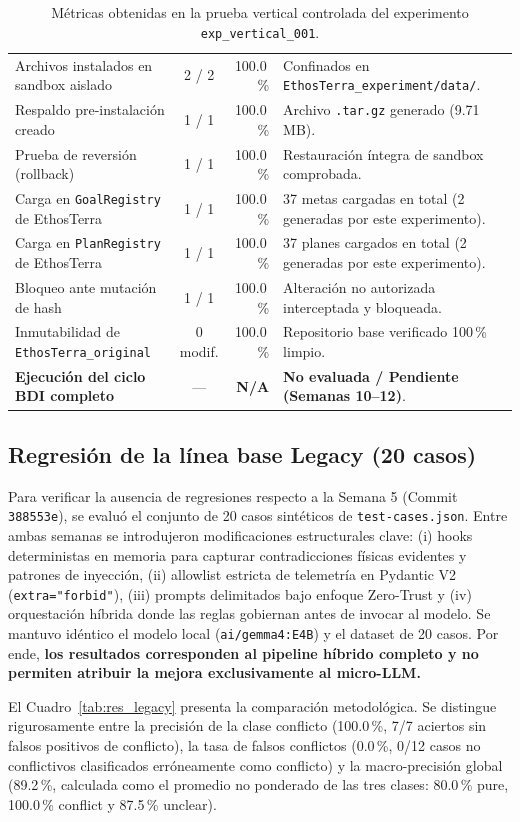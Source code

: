 \documentclass[11pt,a4paper]{article}
\begin{document}
\begin{table}[H]
\begin{tabularx}{\textwidth}{lcrX}
Archivos instalados en sandbox aislado & 2 / 2 & 100.0\,\% & Confinados en \texttt{EthosTerra\_experiment/data/}. \\
Respaldo pre-instalación creado & 1 / 1 & 100.0\,\% & Archivo \texttt{.tar.gz} generado (9.71 MB). \\
Prueba de reversión (rollback) & 1 / 1 & 100.0\,\% & Restauración íntegra de sandbox comprobada. \\
Carga en \texttt{GoalRegistry} de EthosTerra & 1 / 1 & 100.0\,\% & 37 metas cargadas en total (2 generadas por este experimento). \\
Carga en \texttt{PlanRegistry} de EthosTerra & 1 / 1 & 100.0\,\% & 37 planes cargados en total (2 generadas por este experimento). \\
Bloqueo ante mutación de hash & 1 / 1 & 100.0\,\% & Alteración no autorizada interceptada y bloqueada. \\
Inmutabilidad de \texttt{EthosTerra\_original} & 0 modif. & 100.0\,\% & Repositorio base verificado 100\,\% limpio. \\
\midrule
\textbf{Ejecución del ciclo BDI completo} & --- & \textbf{N/A} & \textbf{No evaluada / Pendiente (Semanas 10--12)}. \\
\bottomrule
\end{tabularx}
\caption{Métricas obtenidas en la prueba vertical controlada del experimento \texttt{exp\_vertical\_001}.}
\label{tab:res_vertical}
\end{table}

\subsection{Regresión de la línea base Legacy (20 casos)}
Para verificar la ausencia de regresiones respecto a la Semana 5 (Commit \texttt{388553e}), se evaluó el conjunto de 20 casos sintéticos de \texttt{test-cases.json}. Entre ambas semanas se introdujeron modificaciones estructurales clave: (i) hooks deterministas en memoria para capturar contradicciones físicas evidentes y patrones de inyección, (ii) allowlist estricta de telemetría en Pydantic V2 (\texttt{extra="forbid"}), (iii) prompts delimitados bajo enfoque Zero-Trust y (iv) orquestación híbrida donde las reglas gobiernan antes de invocar al modelo. Se mantuvo idéntico el modelo local (\texttt{ai/gemma4:E4B}) y el dataset de 20 casos. Por ende, \textbf{los resultados corresponden al pipeline híbrido completo y no permiten atribuir la mejora exclusivamente al micro-LLM.}

El Cuadro~\ref{tab:res_legacy} presenta la comparación metodológica. Se distingue rigurosamente entre la precisión de la clase conflicto (100.0\,\%, 7/7 aciertos sin falsos positivos de conflicto), la tasa de falsos conflictos (0.0\,\%, 0/12 casos no conflictivos clasificados erróneamente como conflicto) y la macro-precisión global (89.2\,\%, calculada como el promedio no ponderado de las tres clases: 80.0\,\% pure, 100.0\,\% conflict y 87.5\,\% unclear).
\end{document}
